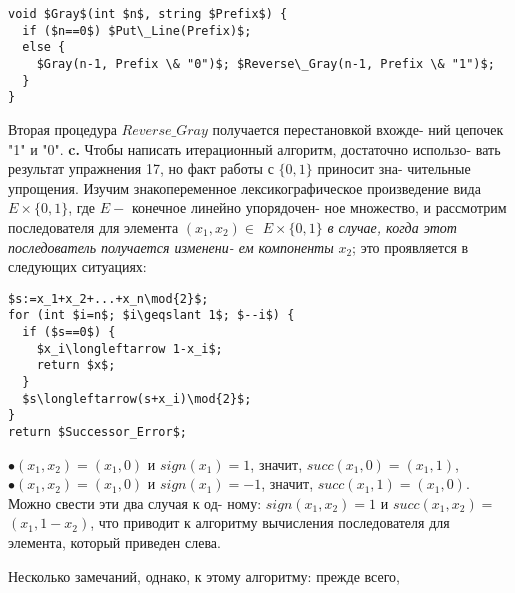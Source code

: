 \begin{lstlisting}[mathescape=true]
void $Gray$(int $n$, string $Prefix$) {
  if ($n==0$) $Put\_Line(Prefix)$;
  else {
    $Gray(n-1, Prefix \& "0")$; $Reverse\_Gray(n-1, Prefix \& "1")$;
  }
}
\end{lstlisting}
\hspace*{15pt}Вторая процедура $Reverse\_Gray$ получается перестановкой вхожде-\linebreak
ний цепочек "1" и "0".\newline
\hspace*{15pt}\textbf{c.} Чтобы написать итерационный алгоритм, достаточно использо­-\linebreak
вать результат упражнения 17, но факт работы с $\{0,1\}$ приносит зна-\linebreak
чительные упрощения. Изучим знакопеременное лексикографическое произведение вида $E\times\{0,1\}$, где $E-$ конечное линейно упорядочен-\linebreak
ное множество, и рассмотрим последователя для элемента $(x_1,x_2)\in$\linebreak
$E\times\{0,1\}$ \textit{в случае, когда этот последователь получается изменени-\linebreak
ем компоненты} $x_2$; это проявляется в следующих ситуациях:
\begin{multicols}{2}
\begin{lstlisting}[mathescape=true, caption=Код Грея]
$s:=x_1+x_2+...+x_n\mod{2}$;
for (int $i=n$; $i\geqslant 1$; $--i$) {
  if ($s==0$) {
    $x_i\longleftarrow 1-x_i$;
    return $x$;
  }
  $s\longleftarrow(s+x_i)\mod{2}$;
}
return $Successor_Error$;
\end{lstlisting}
\columnbreak
$\bullet (x_1,x_2)=(x_1,0)$ и $sign(x_1)=1$,\newline
значит, $succ(x_1,0)=(x_1,1)$,\newline
$\bullet (x_1,x_2)=(x_1,0)$ и $sign(x_1)=-1$,\newline
значит, $succ(x_1,1)=(x_1,0)$.\newline
Можно свести эти два случая к од-\newline
ному: $sign(x_1,x_2)=1$ и $succ(x_1,x_2)=$\linebreak
$(x_1,1-x_2)$, что приводит к алгоритму\linebreak
вычисления последователя для элемента,\linebreak
который приведен слева.
\end{multicols}
\hspace*{15pt}Несколько замечаний, однако, к этому алгоритму: прежде всего,\linebreak
